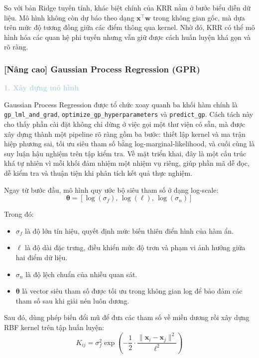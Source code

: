 So với bản Ridge tuyến tính, khác biệt chính của KRR nằm ở bước biểu diễn dữ liệu. Mô hình không còn dự báo theo dạng $\mathbf{x}^\top \mathbf{w}$ trong không gian gốc, mà dựa trên mức độ tương đồng giữa các điểm thông qua kernel. Nhờ đó, KRR có thể mô hình hóa các quan hệ phi tuyến nhưng vẫn giữ được cách huấn luyện khá gọn và rõ ràng.

\subsubsection{[Nâng cao] Gaussian Process Regression (GPR)}

\noindent\textcolor{lightblue}{\textbf{1. Xây dựng mô hình}}

Gaussian Process Regression được tổ chức xoay quanh ba khối hàm chính là \texttt{gp\_lml\_and\_grad}, \texttt{optimize\_gp\_hyperparameters} và \texttt{predict\_gp}. Cách tách này cho thấy phần cài đặt không chỉ dừng ở việc gọi một thư viện có sẵn, mà được xây dựng thành một pipeline rõ ràng gồm ba bước: thiết lập kernel và ma trận hiệp phương sai, tối ưu siêu tham số bằng log-marginal-likelihood, và cuối cùng là suy luận hậu nghiệm trên tập kiểm tra. Về mặt triển khai, đây là một cấu trúc khá tự nhiên vì mỗi khối đảm nhiệm một nhiệm vụ riêng, giúp phần mã dễ đọc, dễ kiểm tra và thuận tiện khi phân tích kết quả thực nghiệm.

Ngay từ bước đầu, mô hình quy ước bộ siêu tham số ở dạng log-scale:
\begin{equation}
    \boldsymbol{\theta} = [\log(\sigma_f),\, \log(\ell),\, \log(\sigma_n)]
\end{equation}

Trong đó:
\begin{itemize}
    \item $\sigma_f$ là độ lớn tín hiệu, quyết định mức biến thiên điển hình của hàm ẩn.
    \item $\ell$ là độ dài đặc trưng, điều khiển mức độ trơn và phạm vi ảnh hưởng giữa hai điểm dữ liệu.
    \item $\sigma_n$ là độ lệch chuẩn của nhiễu quan sát.
    \item $\boldsymbol{\theta}$ là vector siêu tham số được tối ưu trong không gian log để bảo đảm các tham số sau khi giải nén luôn dương.
\end{itemize}

Sau đó, dùng phép biến đổi mũ để đưa các tham số về miền dương rồi xây dựng RBF kernel trên tập huấn luyện:
\begin{equation}
    K_{ij} = \sigma_f^2 \exp\!\left(-\frac{1}{2}\cdot\frac{\lVert \mathbf{x}_i - \mathbf{x}_j \rVert^2}{\ell^2}\right)
\end{equation}

